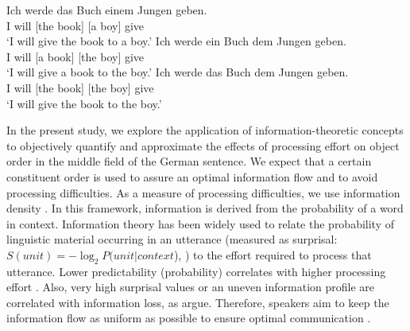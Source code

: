 \documentclass[output=paper,colorlinks,citecolor=brown]{langscibook}
\begin{document}
\ea\label{ex:case-given-all}
  \ea\label{ex:acc-dat.given-new}
  \gll Ich werde \up{[}das Buch\up{]\sub{\textsc{acc}, given}} \up{[}einem Jungen\up{]\sub{\textsc{dat}, new}} geben. \\
    I will [the book] [a boy] give \\
  \glt `I will give the book to a boy.'
%
  \ex\label{ex:acc-dat.new-give}
  \gll Ich werde \up{[}ein Buch\up{]\sub{\textsc{acc}, new}} \up{[}dem Jungen\up{]\sub{\textsc{dat}, given}} geben. \\
  I will [a book] [the boy] give \\
  \glt `I will give a book to the boy.'
%
 \ex\label{ex:acc-dat.given-given}
  \gll Ich werde \up{[}das Buch\up{]\sub{\textsc{acc}, given}} \up{[}dem Jungen\up{]\sub{\textsc{dat}, given}} geben. \\
  I will [the book] [the boy] give \\
  \glt `I will give the book to the boy.'
  \z
\z

In the present study, we explore the application of information-theoretic concepts to objectively quantify and approximate the effects of processing effort on object order in the middle field of the German sentence. We expect that a certain constituent order is used to assure an optimal information flow and to avoid processing difficulties.  
As a measure of processing difficulties, we use information density \citep{shannon-1948}. 
In this framework, information is derived from the probability of a word in context. Information theory has been widely used to relate the probability of linguistic material occurring in an utterance (measured as surprisal: $S(unit) = -\log_2P(unit|context$), \citet{Hale.2001}) to the effort required to process that utterance. Lower predictability (probability) correlates with higher processing effort \citep[e.g.,][]{Hale.2001}. 
Also, very high surprisal values or an uneven information profile are correlated with information loss, as \citep{cuskley21} argue. Therefore, speakers aim to keep the information flow as uniform as possible to ensure optimal communication \citep[``Uniform Information Density Hypothesis'', UID, ][]{Levy.Jaeger, Aylett.Turk.2004}. 
\end{document}
